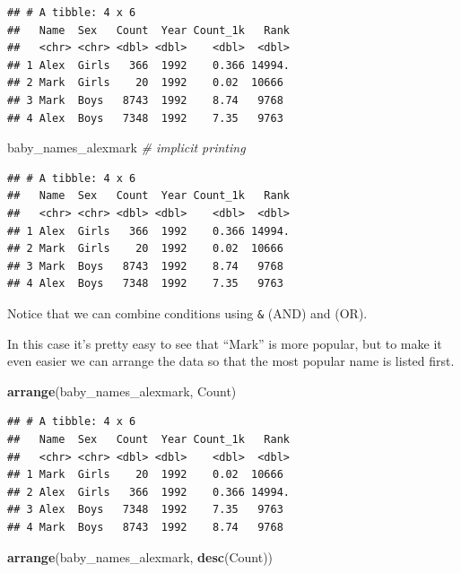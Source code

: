\documentclass[]{book}
\newenvironment{Shaded}{\begin{snugshade}}{\end{snugshade}}
\newcommand{\CommentTok}[1]{\textcolor[rgb]{0.56,0.35,0.01}{\textit{#1}}}
\newcommand{\KeywordTok}[1]{\textcolor[rgb]{0.13,0.29,0.53}{\textbf{#1}}}
\newcommand{\NormalTok}[1]{#1}
\begin{document}
\begin{verbatim}
## # A tibble: 4 x 6
##   Name  Sex   Count  Year Count_1k   Rank
##   <chr> <chr> <dbl> <dbl>    <dbl>  <dbl>
## 1 Alex  Girls   366  1992    0.366 14994.
## 2 Mark  Girls    20  1992    0.02  10666 
## 3 Mark  Boys   8743  1992    8.74   9768 
## 4 Alex  Boys   7348  1992    7.35   9763
\end{verbatim}

\begin{Shaded}
\begin{Highlighting}[]
\NormalTok{baby_names_alexmark }\CommentTok{# implicit printing}
\end{Highlighting}
\end{Shaded}

\begin{verbatim}
## # A tibble: 4 x 6
##   Name  Sex   Count  Year Count_1k   Rank
##   <chr> <chr> <dbl> <dbl>    <dbl>  <dbl>
## 1 Alex  Girls   366  1992    0.366 14994.
## 2 Mark  Girls    20  1992    0.02  10666 
## 3 Mark  Boys   8743  1992    8.74   9768 
## 4 Alex  Boys   7348  1992    7.35   9763
\end{verbatim}

Notice that we can combine conditions using \texttt{\&} (AND)
and \texttt{\textbar{}} (OR).

In this case it's pretty easy to see that ``Mark'' is more popular,
but to make it even easier we can arrange the data so that the
most popular name is listed first.

\begin{Shaded}
\begin{Highlighting}[]
\KeywordTok{arrange}\NormalTok{(baby_names_alexmark, Count)}
\end{Highlighting}
\end{Shaded}

\begin{verbatim}
## # A tibble: 4 x 6
##   Name  Sex   Count  Year Count_1k   Rank
##   <chr> <chr> <dbl> <dbl>    <dbl>  <dbl>
## 1 Mark  Girls    20  1992    0.02  10666 
## 2 Alex  Girls   366  1992    0.366 14994.
## 3 Alex  Boys   7348  1992    7.35   9763 
## 4 Mark  Boys   8743  1992    8.74   9768
\end{verbatim}

\begin{Shaded}
\begin{Highlighting}[]
\KeywordTok{arrange}\NormalTok{(baby_names_alexmark, }\KeywordTok{desc}\NormalTok{(Count))}
\end{Highlighting}
\end{Shaded}
\end{document}

